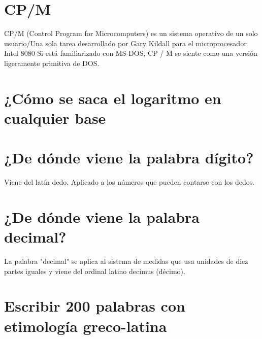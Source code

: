 \documentclass{mylib/reporte}
\begin{document}
\section{CP/M}

CP/M (Control Program for Microcomputers) es un sistema operativo de un solo usuario/Una sola tarea desarrollado por Gary Kildall para el microprocesador Intel 8080
Si está familiarizado con MS-DOS, CP / M se siente como una versión ligeramente primitiva de DOS.

\section{¿Cómo se saca el logaritmo en cualquier base}


\section{¿De dónde viene la palabra dígito?}

Viene del latín dedo. Aplicado a los números que pueden contarse con los dedos.
\section{¿De dónde viene la palabra decimal?}

La palabra "decimal" se aplica al sistema de medidas que usa unidades de diez partes iguales y viene del ordinal latino decimus (décimo).

\section{Escribir 200 palabras con etimología greco-latina}
\end{document}
